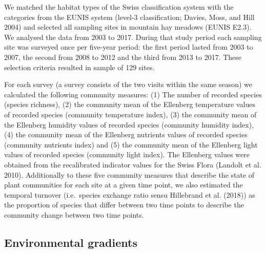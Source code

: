 \documentclass[fleqn,10pt,lineno]{wlpeerj} %
\theoremstyle{definition}
\theoremstyle{definition}
\theoremstyle{definition}
\theoremstyle{remark}
\begin{document}
We matched the habitat types of the Swiss classification system with the
categories from the EUNIS system (level-3 classification; Davies, Moss,
and Hill 2004) and selected all sampling sites in mountain hay meadows
(EUNIS E2.3). We analysed the data from 2003 to 2017. During that study
period each sampling site was surveyed once per five-year period: the
first period lasted from 2003 to 2007, the second from 2008 to 2012 and
the third from 2013 to 2017. These selection criteria resulted in sample
of 129 sites.

For each survey (a survey consists of the two visits within the same
season) we calculated the following community measures: (1) The number
of recorded species (species richness), (2) the community mean of the
Ellenberg temperature values of recorded species (community temperature
index), (3) the community mean of the Ellenberg humidity values of
recorded species (community humidity index), (4) the community mean of
the Ellenberg nutrients values of recorded species (community nutrients
index) and (5) the community mean of the Ellenberg light values of
recorded species (community light index). The Ellenberg values were
obtained from the recalibrated indicator values for the Swiss Flora
(Landolt et al. 2010). Additionally to these five community measures
that describe the state of plant communities for each site at a given
time point, we also estimated the temporal turnover (i.e.~species
exchange ratio sensu Hillebrand et al. (2018)) as the proportion of
species that differ between two time points to describe the community
change between two time points.

\subsection*{Environmental gradients}\label{environmental-gradients}
\end{document}
